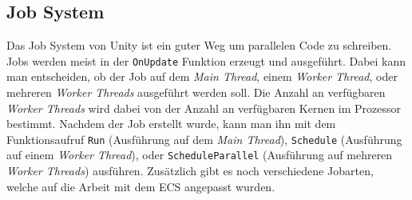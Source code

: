 \subsection{Job System} \label{jobs}
Das Job System von Unity ist ein guter Weg um parallelen Code zu schreiben. Jobs werden meist in der \texttt{OnUpdate} Funktion erzeugt und ausgeführt. Dabei kann man entscheiden, ob der Job auf dem \textit{Main Thread}, einem \textit{Worker Thread}, oder mehreren \textit{Worker Threads} ausgeführt werden soll. Die Anzahl an verfügbaren \textit{Worker Threads} wird dabei von der Anzahl an verfügbaren Kernen im Prozessor bestimmt. Nachdem der Job erstellt wurde, kann man ihn mit dem Funktionsaufruf \texttt{Run} (Ausführung auf dem \textit{Main Thread}), \texttt{Schedule} (Ausführung auf einem \textit{Worker Thread}), oder \texttt{ScheduleParallel} (Ausführung auf mehreren \textit{Worker Threads}) ausführen. Zusätzlich gibt es noch verschiedene Jobarten, welche auf die Arbeit mit dem ECS angepasst wurden.
